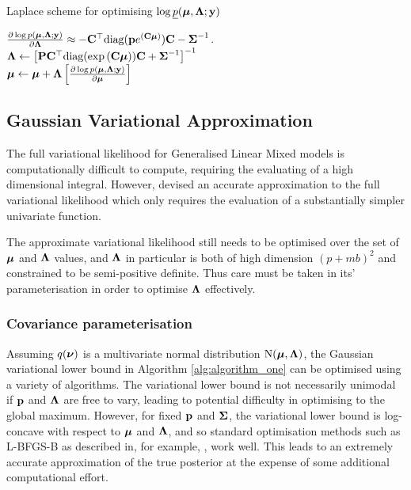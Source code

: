 \documentclass{amsart}[12pt]
\begin{document}
	\begin{algorithm}
		\caption{Laplace scheme for optimising $\log \underline{p}({\boldsymbol \mu}, {\boldsymbol \Lambda}; {\bf y})$}
		\label{alg:laplace_alg}
		\begin{algorithmic}
			\REQUIRE $\frac{\partial \log p({\boldsymbol \mu}, {\boldsymbol \Lambda}; {\bf y})}{\partial {\boldsymbol\Lambda}} \approx - {\bf C}^\top \text{diag}({\bf p} e^{({\bf C} {\boldsymbol \mu})}) {\bf C} - {\boldsymbol \Sigma}^{-1}$.
			\STATE ${\boldsymbol \Lambda} \leftarrow \left [{\bf P} {\bf C}^\top \text{diag}(\exp{({\bf C}{\boldsymbol\mu})}) {\bf C} + {\boldsymbol \Sigma}^{-1} \right ]^{-1}$ \\ [1ex] 
			\STATE ${\boldsymbol \mu} \leftarrow {\boldsymbol\mu} + {\boldsymbol \Lambda} \left [ \frac{\partial \log p({\boldsymbol \mu}, {\boldsymbol \Lambda}; {\bf y})}{\partial {\boldsymbol\mu}} \right ]$ \\ [1ex]
			\ENDWHILE
		\end{algorithmic}
	\end{algorithm}
		
	\subsection{Gaussian Variational Approximation}
		
		
	The full variational likelihood for Generalised Linear Mixed models is computationally difficult to compute,
	requiring the evaluating of a high dimensional integral. However, \citep{ormerod09} devised an accurate
	approximation to the full variational likelihood which only requires the evaluation of a substantially
	simpler univariate function.
	
	The approximate variational likelihood still needs to be optimised over the set of ${\boldsymbol \mu}$ and ${\boldsymbol \Lambda}$
	values, and ${\boldsymbol \Lambda}$ in particular is both of high dimension $(p + mb)^2$ and constrained to be
	semi-positive definite. Thus care must be taken in its' parameterisation in order to optimise
	${\boldsymbol \Lambda}$ effectively.
	
	\subsubsection{Covariance parameterisation}

	Assuming $q({\boldsymbol \nu})$ is a multivariate normal distribution $\text{N}({\boldsymbol \mu}, {\boldsymbol \Lambda})$, the Gaussian variational lower
	bound in Algorithm \ref{alg:algorithm_one} can be optimised using a variety of algorithms. The variational
	lower bound is not necessarily unimodal if ${\bf p}$ and ${\boldsymbol \Lambda}$ are free to vary, leading to potential
	difficulty in optimising to the global maximum. However, for fixed ${\bf p}$ and ${\boldsymbol \Sigma}$, the variational
	lower bound is log-concave with respect to ${\boldsymbol \mu}$ and ${\boldsymbol \Lambda}$, and so standard optimisation methods such
	as L-BFGS-B as described in, for example, \citep{Liu1989}, work well. This leads to an extremely accurate
	approximation of the true posterior at the expense of some additional computational effort.
		
\end{document}
